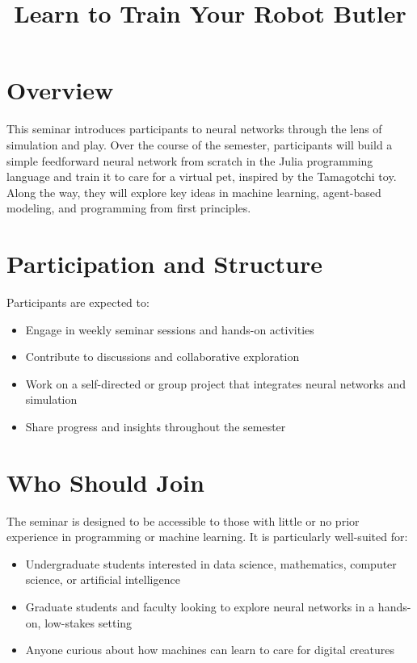 \documentclass[10pt]{book}
\title{Learn to Train Your Robot Butler}
\begin{document}
\maketitle

\section{Overview}

This seminar introduces participants to neural networks through the lens of simulation and play. Over the course of the semester, participants will build a simple feedforward neural network from scratch in the Julia programming language and train it to care for a virtual pet, inspired by the Tamagotchi toy. Along the way, they will explore key ideas in machine learning, agent-based modeling, and programming from first principles.

\section{Participation and Structure}

Participants are expected to:
\begin{itemize}[itemsep=1ex]
    \item Engage in weekly seminar sessions and hands-on activities
    \item Contribute to discussions and collaborative exploration
    \item Work on a self-directed or group project that integrates neural networks and simulation
    \item Share progress and insights throughout the semester
\end{itemize}

\section{Who Should Join}

The seminar is designed to be accessible to those with little or no prior experience in programming or machine learning. It is particularly well-suited for:
\begin{itemize}[itemsep=1ex]
    \item Undergraduate students interested in data science, mathematics, computer science, or artificial intelligence
    \item Graduate students and faculty looking to explore neural networks in a hands-on, low-stakes setting
    \item Anyone curious about how machines can learn to care for digital creatures
\end{itemize}
\end{document}
